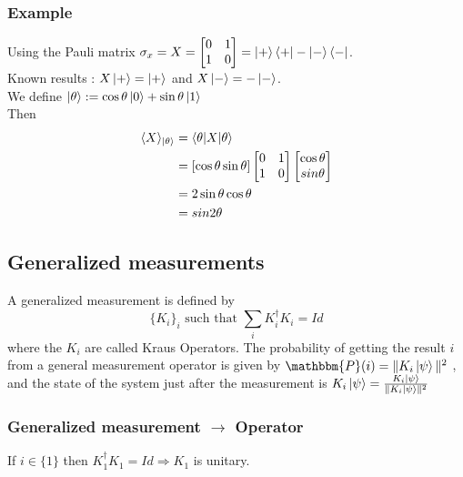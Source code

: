 \documentclass{article}
\begin{document}
\subsubsection*{Example}
Using the Pauli matrix $\sigma_x = X =
    \begin{bmatrix}
    0 & 1 \\
    1 & 0
    \end{bmatrix}
    = \ket{+}\bra{+} - \ket{-}\bra{-}
    $.
\\\noindent
Known results : $X\ket{+} = \ket{+}$ and $X\ket{-}=-\ket{-}$.
\\\noindent
We define $\ket{\theta}:=\cos\theta\ket{0}+\sin\theta\ket{1}$
\\\noindent
Then
\begin{equation}
    \begin{aligned}
        \langle X \rangle_{\ket{\theta}}
            & = \braket{\theta | X |\theta} \\
            & = [\cos \theta \sin \theta]
                \begin{bmatrix}0 & 1 \\ 1 & 0 \end{bmatrix}
                \begin{bmatrix} \cos \theta\\ sin \theta \end{bmatrix} \\
            & = 2 \sin\theta\cos\theta \\
            & = sin 2\theta
    \end{aligned}
\end{equation}


\subsection{Generalized measurements}
A generalized measurement is defined by
\begin{equation}
    \{K_i\}_i \text{ such that } \sum_i K_i^\dagger K_i=Id
\end{equation}
where the $K_i$ are called Kraus Operators.
The probability of getting the result $i$ from a general measurement operator is given by
$\mathbbm{P}(i) = \|K_i\ket{\psi}\|^2$
, and the state of the system just after the measurement is $K_i\ket{\psi}=\frac{K_i\ket{\psi}}{\|K_i\ket{\psi}\|^2}$

\subsubsection*{Generalized measurement $\rightarrow$ Operator}
If $i \in \{1\}$ then
$K_1^\dagger K_1=Id \Rightarrow K_1$ is unitary.%
\end{document}
